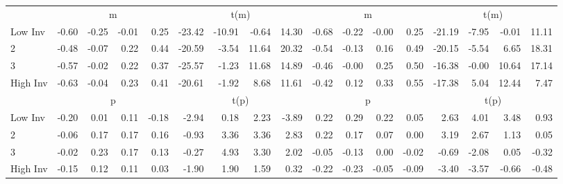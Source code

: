 \begin{table}[!ht]
\begin{tabular}{lrrrrrrrrrrrrrrrr}
  
    
      & \multicolumn{4}{c}{m} & \multicolumn{4}{c}{t(m)}
    
      & \multicolumn{4}{c}{m} & \multicolumn{4}{c}{t(m)}
    
    \\
      \cmidrule(r){2-5} \cmidrule(r){6-9} \cmidrule(r){10-13} \cmidrule(r){14-17}

    Low Inv   & -0.60  & -0.25  & -0.01  & 0.25  & -23.42  & -10.91  & -0.64  & 14.30  & -0.68  & -0.22  & -0.00  & 0.25  & -21.19  & -7.95  & -0.01  & 11.11  \\
           2  & -0.48  & -0.07  & 0.22  & 0.44  & -20.59  & -3.54  & 11.64  & 20.32  & -0.54  & -0.13  & 0.16  & 0.49  & -20.15  & -5.54  & 6.65  & 18.31  \\
           3  & -0.57  & -0.02  & 0.22  & 0.37  & -25.57  & -1.23  & 11.68  & 14.89  & -0.46  & -0.00  & 0.25  & 0.50  & -16.38  & -0.00  & 10.64  & 17.14  \\
    High Inv  & -0.63  & -0.04  & 0.23  & 0.41  & -20.61  & -1.92  & 8.68  & 11.61  & -0.42  & 0.12  & 0.33  & 0.55  & -17.38  & 5.04  & 12.44  & 7.47  \\

  
    
      & \multicolumn{4}{c}{p} & \multicolumn{4}{c}{t(p)}
    
      & \multicolumn{4}{c}{p} & \multicolumn{4}{c}{t(p)}
    
    \\
      \cmidrule(r){2-5} \cmidrule(r){6-9} \cmidrule(r){10-13} \cmidrule(r){14-17}

    Low Inv   & -0.20  & 0.01  & 0.11  & -0.18  & -2.94  & 0.18  & 2.23  & -3.89  & 0.22  & 0.29  & 0.22  & 0.05  & 2.63  & 4.01  & 3.48  & 0.93  \\
           2  & -0.06  & 0.17  & 0.17  & 0.16  & -0.93  & 3.36  & 3.36  & 2.83  & 0.22  & 0.17  & 0.07  & 0.00  & 3.19  & 2.67  & 1.13  & 0.05  \\
           3  & -0.02  & 0.23  & 0.17  & 0.13  & -0.27  & 4.93  & 3.30  & 2.02  & -0.05  & -0.13  & 0.00  & -0.02  & -0.69  & -2.08  & 0.05  & -0.32  \\
    High Inv  & -0.15  & 0.12  & 0.11  & 0.03  & -1.90  & 1.90  & 1.59  & 0.32  & -0.22  & -0.23  & -0.05  & -0.09  & -3.40  & -3.57  & -0.66  & -0.48  \\

  

  \bottomrule
\end{tabular}
\label{tbl:32_Size_BMm_Prior_B16}
\end{table}